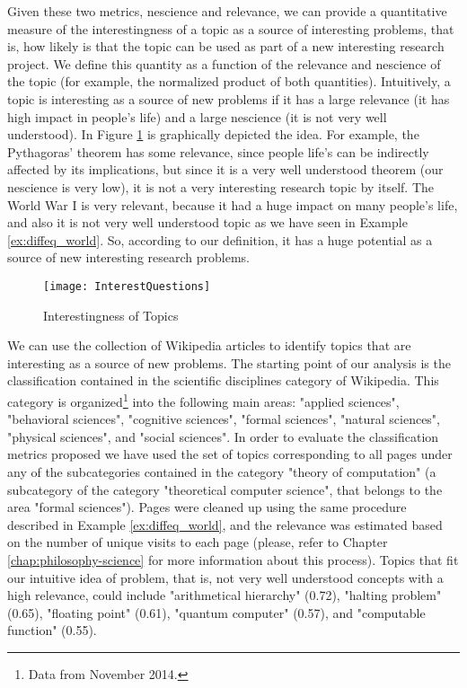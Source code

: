Given these two metrics, nescience and relevance, we can provide a quantitative measure of the interestingness of a topic as a source of interesting problems, that is, how likely is that the topic can be used as part of a new interesting research project. We define this quantity as a function of the relevance and nescience of the topic (for example, the normalized product of both quantities). Intuitively, a topic is interesting as a source of new problems if it has a large relevance (it has high impact in people's life) and a large nescience (it is not very well understood). In Figure \ref{fig:Interestingness-Questions} is graphically depicted the idea. For example, the Pythagoras' theorem has some relevance, since people life's can be indirectly affected by its implications, but since it is a very well understood theorem (our nescience is very low), it is not a very interesting research topic by itself. The World War I is very relevant, because it had a huge impact on many people's life, and also it is not very well understood topic as we have seen in Example \ref{ex:diffeq_world}. So, according to our definition, it has a huge potential as a source of new interesting research problems.

\begin{figure}[h]
\centering\texttt{[image: InterestQuestions]}
\caption{\label{fig:Interestingness-Questions}Interestingness of Topics}
\end{figure}

\begin{example}
\label{ex:wikipedia-problems}
We can use the collection of Wikipedia articles to identify topics that are interesting as a source of new problems. The starting point of our analysis is the classification contained in the scientific disciplines category of Wikipedia. This category is organized\footnote{Data from November 2014.} into the following main areas: "applied sciences", "behavioral sciences", "cognitive sciences", "formal sciences", "natural sciences", "physical sciences", and "social sciences". In order to evaluate the classification metrics proposed we have used the set of topics corresponding to all pages under any of the subcategories contained in the category "theory of computation" (a subcategory of the category "theoretical computer science", that belongs to the area "formal sciences"). Pages were cleaned up using the same procedure described in Example \ref{ex:diffeq_world}, and the relevance was estimated based on the number of unique visits to each page (please, refer to Chapter \ref{chap:philosophy-science} for more information about this process). Topics that fit our intuitive idea of problem, that is, not very well understood concepts with a high relevance, could include "arithmetical hierarchy" (0.72), "halting problem" (0.65), "floating point" (0.61), "quantum computer" (0.57), and "computable function" (0.55).
\end{example}

